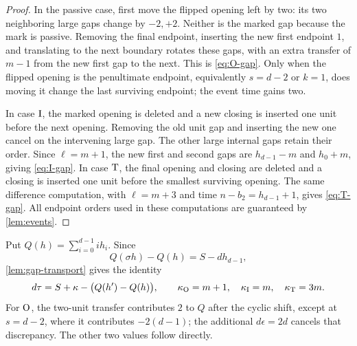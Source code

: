 \begin{proof}
In the passive case, first move the flipped opening left by two: its two neighboring large gaps change by $-2,+2$. Neither is the marked gap because the mark is passive. Removing the final endpoint, inserting the new first endpoint $1$, and translating to the next boundary rotates these gaps, with an extra transfer of $m-1$ from the new first gap to the next. This is \eqref{eq:O-gap}. Only when the flipped opening is the penultimate endpoint, equivalently $s=d-2$ or $k=1$, does moving it change the last surviving endpoint; the event time gains two.

In case $\mathrm{I}$, the marked opening is deleted and a new closing is inserted one unit before the next opening. Removing the old unit gap and inserting the new one cancel on the intervening large gap. The other large internal gaps retain their order. Since $\ell=m+1$, the new first and second gaps are $h_{d-1}-m$ and $h_0+m$, giving \eqref{eq:I-gap}. In case $\mathrm{T}$, the final opening and closing are deleted and a closing is inserted one unit before the smallest surviving opening. The same difference computation, with $\ell=m+3$ and time $n-b_2=h_{d-1}+1$, gives \eqref{eq:T-gap}. All endpoint orders used in these computations are guaranteed by \cref{lem:events}.
\end{proof}

Put $Q(h)=\sum_{i=0}^{d-1}ih_i$. Since
\[
 Q(\sigma h)-Q(h)=S-dh_{d-1},
\]
\cref{lem:gap-transport} gives the identity
\begin{equation}\label{eq:cocycle}
 d\tau=S+\kappa-\bigl(Q(h')-Q(h)\bigr),\qquad
 \kappa_{\mathrm{O}}=m+1,\quad\kappa_{\mathrm{I}}=m,\quad\kappa_{\mathrm{T}}=3m.
\end{equation}
For $\mathrm{O}$, the two-unit transfer contributes $2$ to $Q$ after the cyclic shift, except at $s=d-2$, where it contributes $-2(d-1)$; the additional $d\epsilon=2d$ cancels that discrepancy. The other two values follow directly.

